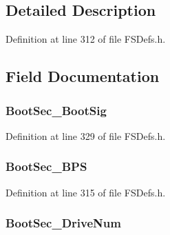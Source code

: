 \subsection{Detailed Description}


Definition at line 312 of file F\+S\+Defs.\+h.



\subsection{Field Documentation}
\hypertarget{struct___b_p_b___f_a_t12_a71da1da2548ac5984ace7ab86665b290}{}
\subsubsection[{Boot\+Sec\+\_\+\+Boot\+Sig}]{ Boot\+Sec\+\_\+\+Boot\+Sig}\label{struct___b_p_b___f_a_t12_a71da1da2548ac5984ace7ab86665b290}


Definition at line 329 of file F\+S\+Defs.\+h.

\hypertarget{struct___b_p_b___f_a_t12_ad659c9ffa17932287cef58634e94b709}{}
\subsubsection[{Boot\+Sec\+\_\+\+B\+P\+S}]{ Boot\+Sec\+\_\+\+B\+P\+S}\label{struct___b_p_b___f_a_t12_ad659c9ffa17932287cef58634e94b709}


Definition at line 315 of file F\+S\+Defs.\+h.

\hypertarget{struct___b_p_b___f_a_t12_a1a90c05e47ba9e37788e1a31b36f6ce9}{}
\subsubsection[{Boot\+Sec\+\_\+\+Drive\+Num}]{ Boot\+Sec\+\_\+\+Drive\+Num}\label{struct___b_p_b___f_a_t12_a1a90c05e47ba9e37788e1a31b36f6ce9}


